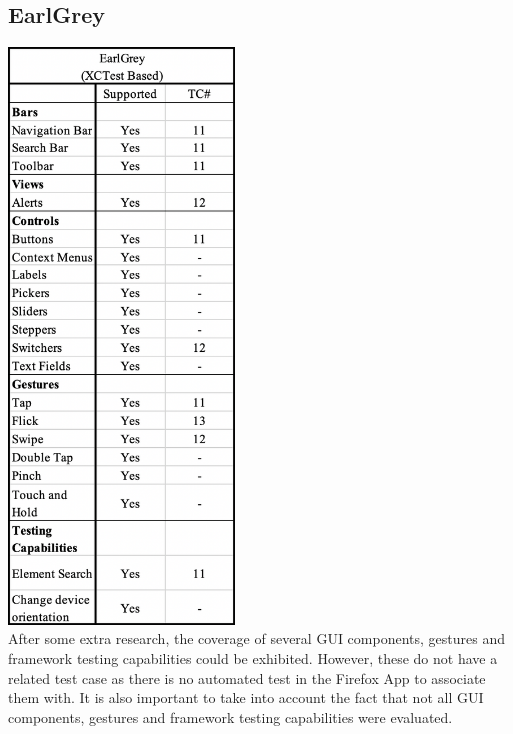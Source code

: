 	\subsection{EarlGrey}
	\includegraphics[width=6cm]{img/table4.png} \\[2mm]

After some extra research, the coverage of several GUI components, gestures and framework testing capabilities could be exhibited. However, these do not have a related test case as there is no automated test in the Firefox App to associate them with. It is also important to take into account the fact that not all GUI components, gestures and framework testing capabilities were evaluated.



	
